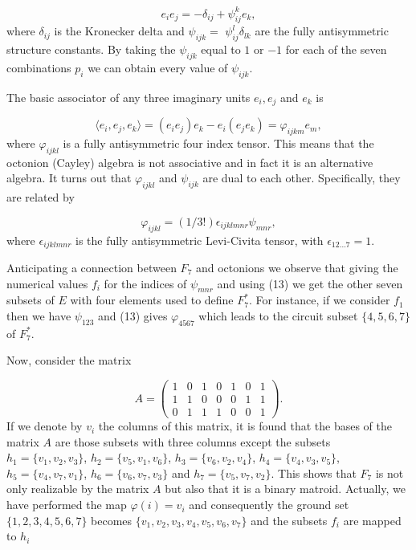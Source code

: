 \documentclass[a4paper,12pt]{article}
\begin{document}
\begin{equation}
e_{i}e_{j}=-\delta _{ij}+\psi _{ij}^{k}e_{k},  \label{11}
\end{equation}
where $\delta _{ij}$ is the Kronecker delta and $\psi _{ijk}=$ $\psi
_{ij}^{l}\delta _{lk}$ are the fully antisymmetric structure constants. By
taking the $\psi _{ijk}$ equal to $1$ or $-1$ for each of the seven
combinations $p_{i}$ we can obtain every value of $\psi _{ijk}$.

The basic associator of any three imaginary units $e_{i},e_{j}$ and $e_{k}$
is

\begin{equation}
\langle e_{i},e_{j},e_{k}\rangle
=(e_{i}e_{j})e_{k}-e_{i}(e_{j}e_{k})=\varphi _{ijkm}e_{m},  \label{12}
\end{equation}
where $\varphi _{ijkl}$ is a fully antisymmetric four index tensor. This
means that the octonion (Cayley) algebra is not associative and in fact it
is an alternative algebra. It turns out that $\varphi _{ijkl}$ and $\psi
_{ijk}$ are dual to each other. Specifically, they are related by

\begin{equation}
\varphi _{ijkl}=(1/3!)\epsilon _{ijklmnr}\psi _{mnr},  \label{13}
\end{equation}
where $\epsilon _{ijklmnr}$ is the fully antisymmetric Levi-Civita tensor,
with $\epsilon _{12...7}=1$.

Anticipating a connection between $F_{7}$ and octonions we observe that
giving the numerical values $f_{i}$ for the indices of $\psi _{mnr}$ and
using (13) we get the other seven subsets of $E$ with four elements used to
define $F_{7}^{\ast }.$ For instance, if we consider $f_{1}$ then we have $%
\psi _{123}$ and (13) gives $\varphi _{4567}$ which leads to the circuit
subset $\{4,5,6,7\}$ of $F_{7}^{\ast }.$

Now, consider the matrix

\begin{equation}
A=\left( 
\begin{array}{ccccccc}
1 & 0 & 1 & 0 & 1 & 0 & 1 \\ 
1 & 1 & 0 & 0 & 0 & 1 & 1 \\ 
0 & 1 & 1 & 1 & 0 & 0 & 1
\end{array}
\right) .  \label{14}
\end{equation}
If we denote by $v_{i}$ the columns of this matrix, it is found that the
bases of the matrix $A$ are those subsets with three columns except the
subsets $h_{1}=\{v_{1},v_{2},v_{3}\}$, $h_{2}=\{v_{5},v_{1},v_{6}\}$, $%
h_{3}=\{v_{6},v_{2},v_{4}\}$, $h_{4}=\{v_{4},v_{3},v_{5}\}$, $%
h_{5}=\{v_{4},v_{7},v_{1}\}$, $h_{6}=\{v_{6},v_{7},v_{3}\}$ and $%
h_{7}=\{v_{5},v_{7},v_{2}\}.$ This shows that $F_{7}$ is not only realizable
by the matrix $A$ but also that it is a binary matroid. Actually, we have
performed the map $\varphi (i)=v_{i}$ and consequently the ground set $%
\{1,2,3,4,5,6,7\}$ becomes $\{v_{1},v_{2},v_{3},v_{4},v_{5},v_{6},v_{7}\}$
and the subsets $f_{i}$ are mapped to $h_{i}$
\end{document}
